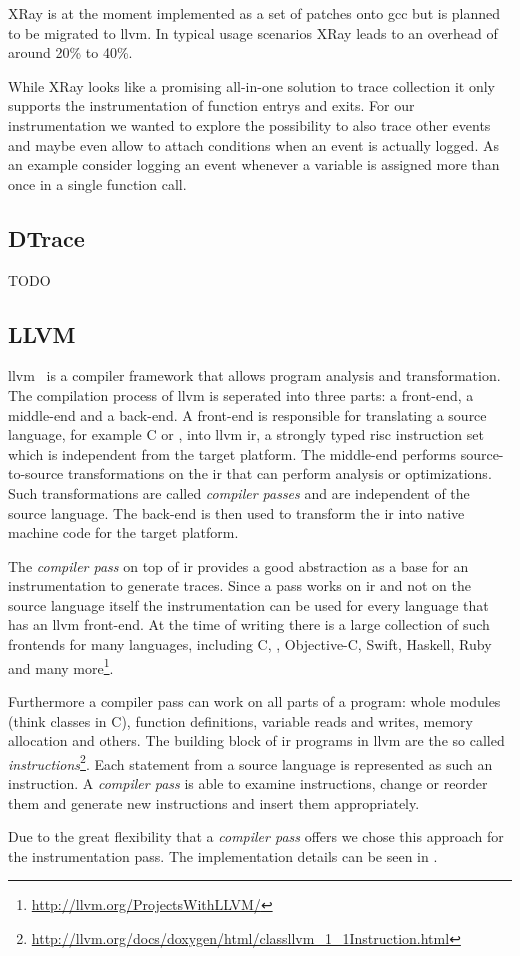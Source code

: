 XRay is at the moment implemented as a set of patches onto \gls{gcc} but is planned to be migrated to \gls{llvm}.
In typical usage scenarios XRay leads to an overhead of around 20\% to 40\%.

While XRay looks like a promising all-in-one solution to trace collection it only supports the instrumentation of function entrys and exits.
For our instrumentation we wanted to explore the possibility to also trace other events and maybe even allow to attach conditions when an event is actually logged.
As an example consider logging an event whenever a variable is assigned more than once in a single function call.

\subsection{DTrace}
TODO

\subsection{LLVM}
\label{sec:related:traces:llvm}

\Gls{llvm}~\cite{Lattner2004} is a compiler framework that allows program analysis and transformation.
The compilation process of \gls{llvm} is seperated into three parts: a front-end, a middle-end and a back-end.
A front-end is responsible for translating a source language, for example C or \CC, into \gls{llvm} \gls{ir}, a strongly typed \gls{risc} instruction set which is independent from the target platform.
The middle-end performs source-to-source transformations on the \gls{ir} that can perform analysis or optimizations.
Such transformations are called \emph{compiler passes} and are independent of the source language.
The back-end is then used to transform the \gls{ir} into native machine code for the target platform.

The \emph{compiler pass} on top of \gls{ir} provides a good abstraction as a base for an instrumentation to generate traces.
Since a pass works on \gls{ir} and not on the source language itself the instrumentation can be used for every language that has an \gls{llvm} front-end.
At the time of writing there is a large collection of such frontends for many languages, including C, \CC, Objective-C, Swift, Haskell, Ruby and many more\footnote{\url{http://llvm.org/ProjectsWithLLVM/}}.

Furthermore a compiler pass can work on all parts of a program: whole modules (think classes in C), function definitions, variable reads and writes, memory allocation and others.
The building block of \gls{ir} programs in \gls{llvm} are the so called \emph{instructions}\footnote{\url{http://llvm.org/docs/doxygen/html/classllvm_1_1Instruction.html}}.
Each statement from a source language is represented as such an instruction.
A \emph{compiler pass} is able to examine instructions, change or reorder them and generate new instructions and insert them appropriately.

Due to the great flexibility that a \emph{compiler pass} offers we chose this approach for the instrumentation pass.
The implementation details can be seen in .

